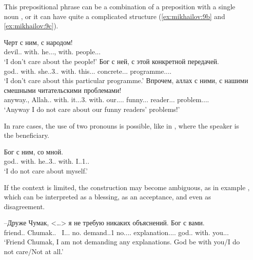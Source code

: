 \documentclass[output=paper]{langscibook}
\begin{document}
This prepositional phrase can be a combination of a preposition with a single noun , or it can have quite a complicated structure (\ref{ex:mikhailov:9b} and \ref{ex:mikhailov:9c}).


\ea\label{ex:mikhailov:9}
\ea \label{ex:mikhailov:9a}
\gll Черт с ним, с народом!\\
     devil.{\NOUN}.{\NOM} with.{\PREP} he.{\PRON}.{\INSTR}.{\SG}, with.{\PREP} people.{\PRON}.{\INSTR}.{\SG}\\
\glt `I don’t care about the people!'
\ex \label{ex:mikhailov:9b}
\gll Бог с ней, с этой конкретной передачей.\\
     god.{\NOUN}.{\NOM} with.{\PREP} she.{\PRON}.3{\glossF}.{\INSTR}.{\SG} with.{\PREP} this.{\PRON}.{\INSTR}.{\SG} concrete.{\ADJ}.{\INSTR}.{\SG} programme.{\NOUN}.{\glossF}.{\INSTR}.{\SG}\\
\glt `I don’t care about this particular programme.'
\ex \label{ex:mikhailov:9c}
\gll Впрочем, аллах с ними, с нашими смешными читательскими проблемами!\\
     anyway.{\ADV}, Allah.{\NOUN}.{\NOM} with.{\PREP} it.{\PRON}.{\INSTR}.3.{\PL} with.{\PREP} our.{\PRON}.{\POSS}.{\INSTR}.{\PL} funny.{\ADJ}.{\INSTR}.{\PL} reader.{\ADJ}.{\INSTR}.{\PL} problem.{\NOUN}.{\glossF}.{\INSTR}.{\PL}\\
\glt `Anyway I do not care about our funny readers’ problems!'
\z
\z

In rare cases, the use of two pronouns is possible, like in , where the speaker is the beneficiary.

\ea \label{ex:mikhailov:10}
\gll Бог с ним, со мной.\\
     god.{\NOUN}.{\NOM} with.{\PREP} he.{\PRON}.3{\glossM}.{\INSTR}.{\SG} with.{\PREP} I.{\PRON}.1.{\INSTR}.{\SG}\\
\glt `I do not care about myself.'
\z

If the context is limited, the construction may become ambiguous, as in example , which can be interpreted as a blessing, as an acceptance, and even as disagreement.


\ea \label{ex:mikhailov:11}
\gll –Друже Чумак,     <…> я не требую никаких объяснений. Бог с вами.\\
    friend.{\NOUN}.{\VOC} Chumak.{\NOUNPROPER}.{\NOM}  ~I.{\PRON}.{\NOM}.{\SG} no.{\PTCP} demand.{\PRES}.1{\SG} no.{\PRON}.{\NEG}.{\GEN}.{\PL} explanation.{\NOUN}.{\GEN}.{\PL}. god.{\NOUN}.{\NOM} with.{\PREP} you.{\PRON}.{\INSTR}.{\PL}\\
\glt `Friend Chumak, I am not demanding any explanations. God be with you\slash I do not care\slash Not at all.'
\z
\end{document}
